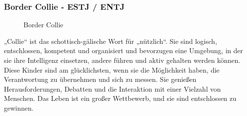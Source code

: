 \subsubsection{Border Collie - ESTJ / ENTJ}
\begin{figure}[htbp!]
	\centering
	\caption[Border Collie]{Border Collie}
	\label{img:Border_Collie}
\end{figure}
„Collie“ ist das schottisch-gälische Wort für „nützlich“. Sie sind logisch, entschlossen, kompetent und organisiert und bevorzugen eine Umgebung, in der sie ihre Intelligenz einsetzen, andere führen und aktiv gehalten werden können. Diese Kinder sind am glücklichsten, wenn sie die Möglichkeit haben, die Verantwortung zu übernehmen und sich zu messen. Sie genießen Herausforderungen, Debatten und die Interaktion mit einer Vielzahl von Menschen. Das Leben ist ein großer Wettbewerb, und sie sind entschlossen zu gewinnen.

